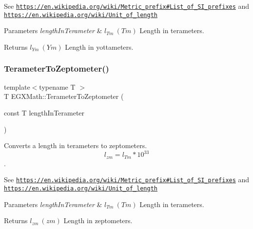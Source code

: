 See \href{https://en.wikipedia.org/wiki/Metric_prefix#List_of_SI_prefixes}{\tt https\+://en.\+wikipedia.\+org/wiki/\+Metric\+\_\+prefix\#\+List\+\_\+of\+\_\+\+S\+I\+\_\+prefixes} and \href{https://en.wikipedia.org/wiki/Unit_of_length}{\tt https\+://en.\+wikipedia.\+org/wiki/\+Unit\+\_\+of\+\_\+length} 
\begin{DoxyParams}{Parameters}
{\em length\+In\+Terameter} & $ l_{Tm}\ (Tm)$ Length in terameters. \\
\hline
\end{DoxyParams}
\begin{DoxyReturn}{Returns}
$ l_{Ym}\ (Ym)$ Length in yottameters. 
\end{DoxyReturn}
\mbox{\label{group___e_g_x_math-_conversions-_length_conversions-_s_i-_terameter-_s_i_ga2347b883d209d99cd37a4f273a1c6920}} 
\subsubsection{\texorpdfstring{Terameter\+To\+Zeptometer()}{TerameterToZeptometer()}}
{\footnotesize\ttfamily template$<$typename T $>$ \\
T E\+G\+X\+Math\+::\+Terameter\+To\+Zeptometer (\begin{DoxyParamCaption}\item[{const T}]{length\+In\+Terameter }\end{DoxyParamCaption})}



Converts a length in terameters to zeptometers. \[ l_{zm}=l_{Tm} * 10^{33} \]. 

See \href{https://en.wikipedia.org/wiki/Metric_prefix#List_of_SI_prefixes}{\tt https\+://en.\+wikipedia.\+org/wiki/\+Metric\+\_\+prefix\#\+List\+\_\+of\+\_\+\+S\+I\+\_\+prefixes} and \href{https://en.wikipedia.org/wiki/Unit_of_length}{\tt https\+://en.\+wikipedia.\+org/wiki/\+Unit\+\_\+of\+\_\+length} 
\begin{DoxyParams}{Parameters}
{\em length\+In\+Terameter} & $ l_{Tm}\ (Tm)$ Length in terameters. \\
\hline
\end{DoxyParams}
\begin{DoxyReturn}{Returns}
$ l_{zm}\ (zm)$ Length in zeptometers. 
\end{DoxyReturn}
\mbox{\label{group___e_g_x_math-_conversions-_length_conversions-_s_i-_terameter-_s_i_gad897b4a8fd5405a7996ae3437194b030}} 
